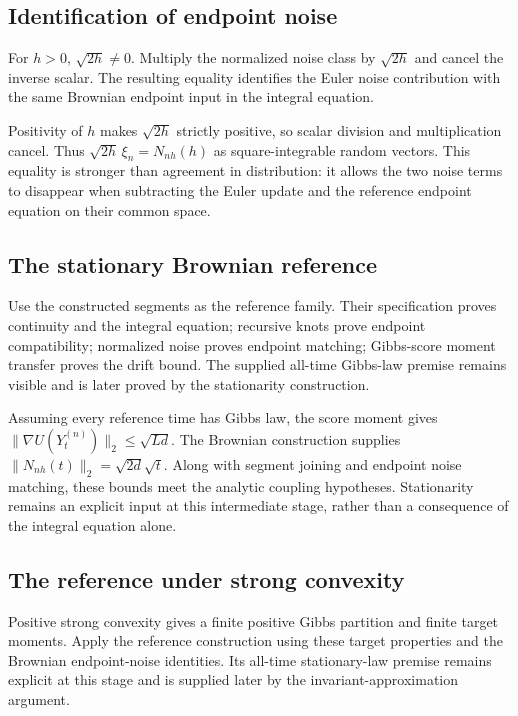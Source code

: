 \documentclass[11pt,a4paper]{article}
\begin{document}
\subsection{\texorpdfstring{Identification of endpoint noise}{Identification of endpoint noise}}


For \(h>0\), \(\sqrt{2h}\ne0\). Multiply the normalized noise class by \(\sqrt{2h}\) and cancel the inverse scalar. The resulting equality identifies the Euler noise contribution with the same Brownian endpoint input in the integral equation.



Positivity of \(h\) makes \(\sqrt{2h}\) strictly positive, so scalar division and multiplication cancel. Thus \(\sqrt{2h}\,\xi_n=N_{nh}(h)\) as square-integrable random vectors. This equality is stronger than agreement in distribution: it allows the two noise terms to disappear when subtracting the Euler update and the reference endpoint equation on their common space.


\subsection{\texorpdfstring{The stationary Brownian reference}{The stationary Brownian reference}}


Use the constructed segments as the reference family. Their specification proves continuity and the integral equation; recursive knots prove endpoint compatibility; normalized noise proves endpoint matching; Gibbs-score moment transfer proves the drift bound. The supplied all-time Gibbs-law premise remains visible and is later proved by the stationarity construction.



Assuming every reference time has Gibbs law, the score moment gives \(\|\nabla U(Y_t^{(n)})\|_2\le\sqrt{Ld}\). The Brownian construction supplies \(\|N_{nh}(t)\|_2=\sqrt{2d}\sqrt t\). Along with segment joining and endpoint noise matching, these bounds meet the analytic coupling hypotheses. Stationarity remains an explicit input at this intermediate stage, rather than a consequence of the integral equation alone.


\subsection{\texorpdfstring{The reference under strong convexity}{The reference under strong convexity}}


Positive strong convexity gives a finite positive Gibbs partition and finite target moments. Apply the reference construction using these target properties and the Brownian endpoint-noise identities. Its all-time stationary-law premise remains explicit at this stage and is supplied later by the invariant-approximation argument.
\end{document}
